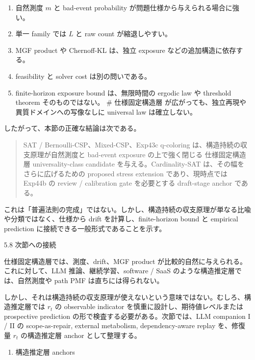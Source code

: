 \documentclass[12pt,a4paper]{article}
\begin{document}
\begin{enumerate}
\def\labelenumi{\arabic{enumi}.}
\tightlist
\item
  自然測度 \(m\) と bad-event probability が問題仕様から与えられる場合に強い。
\item
  単一 family では \(L\) と raw count が縮退しやすい。
\item
  MGF product や Chernoff-KL は、独立 exposure などの追加構造に依存する。
\item
  feasibility と solver cost は別の問いである。
\item
  finite-horizon exposure bound は、無限時間の ergodic law や threshold theorem そのものではない。 \# 仕様固定構造層 が広がっても、独立再現や異質ドメインへの写像なしに universal law は確立しない。
\end{enumerate}

したがって、本節の正確な結論は次である。

\begin{quote}
SAT / Bernoulli-CSP、Mixed-CSP、Exp43c q-coloring は、構造持続の収支原理が自然測度と bad-event exposure の上で強く閉じる 仕様固定構造層 universality-class candidate を与える。Cardinality-SAT は、その幅をさらに広げるための proposed stress extension であり、現時点では Exp44b の review / calibration gate を必要とする draft-stage anchor である。
\end{quote}

これは「普遍法則の完成」ではない。しかし、構造持続の収支原理が単なる比喩や分類ではなく、仕様から drift を計算し、finite-horizon bound と empirical prediction に接続できる一般形式であることを示す。

5.8 次節への接続

仕様固定構造層では、測度、drift、MGF product が比較的自然に与えられる。これに対して、LLM 推論、継続学習、software / SaaS のような構造推定層では、自然測度や path PMF は直ちには得られない。

しかし、それは構造持続の収支原理が使えないという意味ではない。むしろ、構造推定層では \(r_{t}\) の observable indicator を慎重に設計し、期待値レベルまたは prospective prediction の形で検査する必要がある。次節では、LLM companion I / II の scope-as-repair, external metabolism, dependency-aware replay を、修復量 \(r_{t}\) の構造推定層 anchor として整理する。

\begin{enumerate}
\def\labelenumi{\arabic{enumi}.}
\setcounter{enumi}{5}
\tightlist
\item
  構造推定層 anchors
\end{enumerate}
\end{document}
